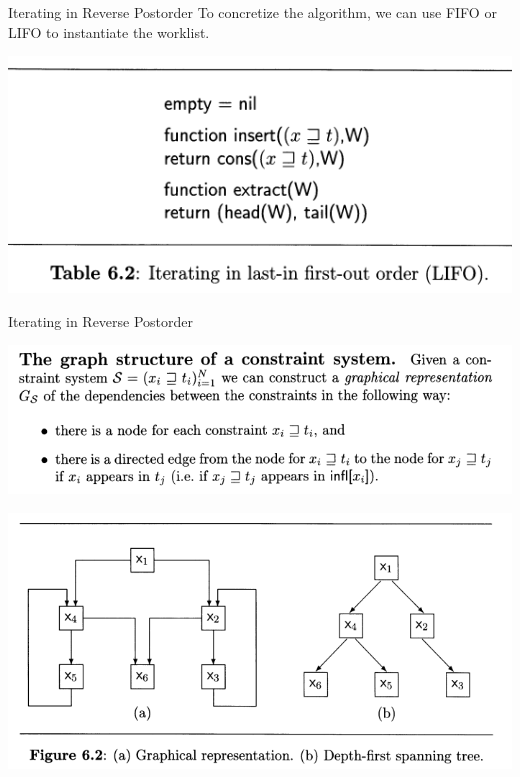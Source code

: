\documentclass[aspectratio=1610, 13pt]{beamer}
\begin{document}
\begin{frame}{Iterating in Reverse Postorder}
To concretize the algorithm, we can use FIFO or LIFO to instantiate the worklist.

\begin{center}
\includegraphics[scale=0.45]{fifo.png}
\end{center}
\end{frame}
\begin{frame}{Iterating in Reverse Postorder}
\begin{center}
\includegraphics[scale=0.45]{graphderf.png}


\includegraphics[scale=0.33]{gexp.png}
\end{center}
\end{frame}
\end{document}
